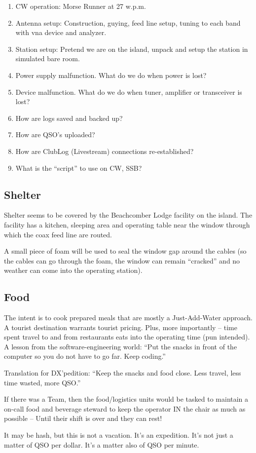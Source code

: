 \documentclass[11pt]{article}
\begin{document}
\begin{enumerate}
\item CW operation: Morse Runner at 27 w.p.m.
\item Antenna setup: Construction, guying, feed line setup, tuning to
each band with {\gls{vna}} device and analyzer.
\item Station setup: Pretend we are on the island, unpack and setup the station
in simulated bare room.
\item Power supply malfunction.  What do we do when power is lost?
\item Device malfunction. What do we do when tuner, amplifier or transceiver
is lost?
\item How are logs saved and backed up?
\item How are QSO's uploaded?
\item How are ClubLog (Livestream) connections re-established?
\item What is the ``script'' to use on CW, SSB?
\end{enumerate}

\subsection{Shelter}

Shelter seems to be covered by the Beachcomber Lodge facility on
the island. The facility has a kitchen, sleeping area and 
operating table near the window through which the coax feed line
are routed.
\par
A small piece of foam will be used to seal the window gap around the cables (so
the cables can go through the foam, the window can remain ``cracked'' and no weather
can come into the operating station).

\subsection{Food}

The intent is to cook prepared meals that are mostly a Just-Add-Water
approach.  A tourist destination warrants tourist pricing.  Plus,
more importantly -- time spent travel to and from restaurants
eats into the operating time (pun intended).   A lesson from
the software-engineering world:  ``Put the snacks in front
of the computer so you do not have to go far. Keep coding.''
\par
Translation for DX'pedition: ``Keep the snacks and food close. Less
travel, less time wasted, more QSO.''
\par
If there was a Team, then the food/logistics units would be
tasked to maintain a on-call food and beverage steward to keep
the operator IN the chair as much as possible -- Until their shift
is over and they can rest!
\par
It may be hash, but this is not a vacation. It's an expedition.  It's not
just a matter of QSO per dollar.  It's a matter also of QSO per minute.
\par
\end{document}
